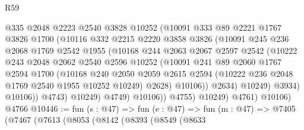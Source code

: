 \begin{lexlean}{R59}
\begin{coremodule}
                        @335
                        @2048
                        @2223
                        @2540
                        @3828
                        @10252
                        (@10091
                          @333
                          @89
                          @2221
                          @1767
                          @3826
                          @1700
                          (@10116
                            @332
                            @2215
                            @2220
                            @3858
                            @3826
                            (@10091
                              @245
                              @236
                              @2068
                              @1769
                              @2542
                              @1955
                              (@10168
                                @244
                                @2063
                                @2067
                                @2597
                                @2542
                                (@10222
                                  @243
                                  @2048
                                  @2062
                                  @2540
                                  @2596
                                  @10252
                                  (@10091
                                    @241
                                    @89
                                    @2060
                                    @1767
                                    @2594
                                    @1700
                                    (@10168
                                      @240
                                      @2050
                                      @2059
                                      @2615
                                      @2594
                                      (@10222 @236 @2048 @1769 @2540 @1955 @10252 @10249)
                                      @2628)
                                    @10106))
                                @2634)
                              @10249)
                            @3934)
                          @10106))
                      @4743)
                    @10249)
                  @4749)
                @10106))
            @4755)
          @10249)
        @4761)
      @10106)
    @4766
@10446 := fun (s : @47) =>
  fun (e : @47) =>
  fun (m : @47) =>
  @7405
    (@7467
      (@7613
        (@8053
          (@8142
            (@8393
              (@8549
                (@8633

\end{coremodule}
\end{lexlean}
